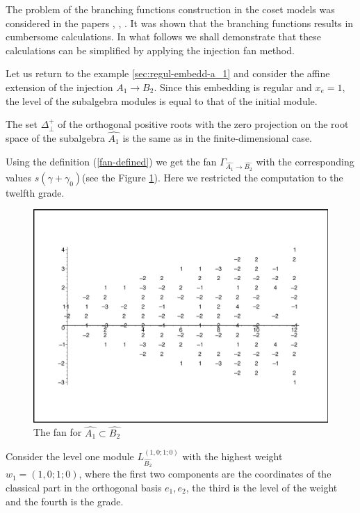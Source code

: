 \documentclass[a4paper,12pt]{article}
\theoremstyle{definition} \newtheorem{Def}{Definition}
\begin{document}
The problem of the branching functions construction in the coset models was considered in the papers \cite{Dunbar:1992gh}, \cite{Hwang:1994yr}, \cite{lu1994branching}. It was shown that the branching functions results in cumbersome calculations. In what follows we shall demonstrate that these calculations can be simplified by applying the injection fan method.

Let us return to the example \ref{sec:regul-embedd-a_1} and consider the affine extension of the injection $A_1 \to  B_2$.
Since this embedding is regular and $x_e=1$, the level of the  subalgebra modules is equal to that of the initial module.

The set $\Delta^{+}_{\bot}$ of the orthogonal positive roots with the zero projection on the root space of the subalgebra $\hat{A_1}$ is the same as in the finite-dimensional case.

Using the definition (\ref{fan-defined}) we get the fan $\Gamma_{\hat{A_1} \longrightarrow  \hat{B_2} }$ with the corresponding values $s(\gamma+\gamma_0)$(see the Figure \ref{fig:AffineB2A1Fan}).
Here we restricted the computation to the twelfth grade.
\begin{figure}[h!bt]
  \centering
  \includegraphics[width=135mm]{AffineB2_A1_fan.pdf}
  \caption{The fan for $\hat{A_1}\subset \hat{B_2}$}
  \label{fig:AffineB2A1Fan}
\end{figure}


Consider the level one module $L^{\left( 1,0;1;0 \right)}_{\hat{B_2}}$  with the highest weight $w_1=(1,0;1;0)$, where the first two components are the coordinates of the classical part in the orthogonal basis $e_1,e_2$, the third is the level of the weight and the fourth is the grade.
\end{document}
